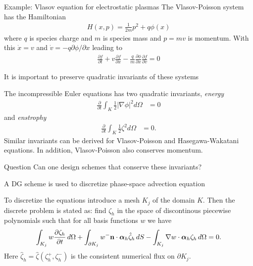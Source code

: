\documentclass[pdf]{beamer}
\newcommand{\pfrac}[2]{\frac{\partial #1}{\partial #2}}
\newcommand{\pfraca}[1]{\frac{\partial}{\partial #1}}
\newcommand{\mvec}[1]{\mathbf{#1}}
\newcommand{\gvec}[1]{\boldsymbol{#1}}
\newcommand{\mypause}{\pause}
\theoremstyle{definition}
\begin{document}
\begin{frame}{Example: Vlasov equation for electrostatic plasmas}%
  The Vlasov-Poisson system has the Hamiltonian
  \begin{align*}
    H(x,p) = \frac{1}{2m}p^2 + q\phi(x)
  \end{align*}
  where $q$ is species charge and $m$ is species mass and $p=mv$ is
  momentum. With this $\dot{x} = v$ and $\dot{v} =
  -q\partial\phi/\partial x$ leading to
  \begin{align*}
    \pfrac{f}{t} + v\pfrac{f}{x} -
    \frac{q}{m}\pfrac{\phi}{x}\pfrac{f}{v} = 0
  \end{align*}
\end{frame}

\begin{frame}{It is important to preserve quadratic invariants of
    these systems}%

  The incompressible Euler equations has two quadratic invariants,
  \emph{energy}
  \begin{align*}
    \pfraca{t}\int_K \frac{1}{2} |\nabla\phi|^2  d\Omega &= 0
  \end{align*}
  and \emph{enstrophy}
  \begin{align*}
    \pfraca{t}\int_K \frac{1}{2}\zeta^2 d\Omega &= 0.
  \end{align*}
  Similar invariants can be derived for Vlasov-Poisson and
  Hasegawa-Wakatani equations.  In addition, Vlasov-Poisson also
  conserves momentum.
  \mypause
  \begin{block}{Question}
    Can one design schemes that conserve these invariants?
  \end{block}

\end{frame}

\begin{frame}{A DG scheme is used to discretize phase-space advection
    equation}

  To discretize the equations introduce a mesh $K_j$ of the domain
  $K$. Then the discrete problem is stated as: find $\zeta_h$ in the
  space of discontinous piecewise polynomials such that for all basis
  functions $w$ we have
  \begin{align*}
    \int_{K_j} w \pfrac{\zeta_h}{t}\thinspace d\Omega 
    +
    \int_{\partial K_j}w^- \mvec{n}\cdot\gvec{\alpha}_h\hat{\zeta}_h\thinspace dS
    -
    \int_{K_j} \nabla w\cdot\gvec{\alpha}_h \zeta_h\thinspace d\Omega = 0.
  \end{align*}
  Here $\hat{\zeta}_h = \hat{\zeta}(\zeta^+_h,\zeta^-_h)$ is the
  consistent numerical flux on $\partial K_j$.
\end{frame}
\end{document}
